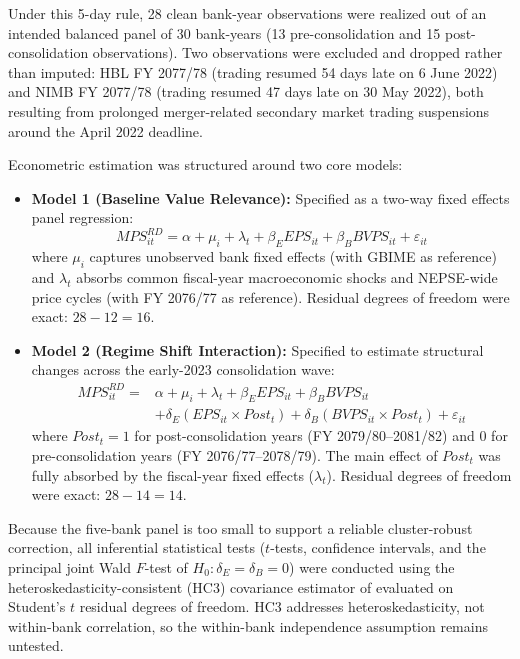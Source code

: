 Under this 5-day rule, 28 clean bank-year observations were realized out of an intended balanced panel of 30 bank-years (13 pre-consolidation and 15 post-consolidation observations). Two observations were excluded and dropped rather than imputed: HBL FY 2077/78 (trading resumed 54 days late on 6 June 2022) and NIMB FY 2077/78 (trading resumed 47 days late on 30 May 2022), both resulting from prolonged merger-related secondary market trading suspensions around the April 2022 deadline.

Econometric estimation was structured around two core models:
\begin{itemize}
    \item \textbf{Model 1 (Baseline Value Relevance):} Specified as a two-way fixed effects panel regression:
    \begin{equation}
    \mathit{MPS}^{RD}_{it} = \alpha + \mu_i + \lambda_t + \beta_E \mathit{EPS}_{it} + \beta_B \mathit{BVPS}_{it} + \varepsilon_{it}
    \end{equation}
    where $\mu_i$ captures unobserved bank fixed effects (with GBIME as reference) and $\lambda_t$ absorbs common fiscal-year macroeconomic shocks and NEPSE-wide price cycles (with FY 2076/77 as reference). Residual degrees of freedom were exact: $28 - 12 = 16$.
    \item \textbf{Model 2 (Regime Shift Interaction):} Specified to estimate structural changes across the early-2023 consolidation wave:
    \begin{equation}
    \begin{aligned}
    \mathit{MPS}^{RD}_{it} ={}& \alpha + \mu_i + \lambda_t + \beta_E \mathit{EPS}_{it} + \beta_B \mathit{BVPS}_{it} \\
    & + \delta_E (\mathit{EPS}_{it} \times \mathit{Post}_t) + \delta_B (\mathit{BVPS}_{it} \times \mathit{Post}_t) + \varepsilon_{it}
    \end{aligned}
    \end{equation}
    where $\mathit{Post}_t = 1$ for post-consolidation years (FY 2079/80--2081/82) and 0 for pre-consolidation years (FY 2076/77--2078/79). The main effect of $\mathit{Post}_t$ was fully absorbed by the fiscal-year fixed effects ($\lambda_t$). Residual degrees of freedom were exact: $28 - 14 = 14$.
\end{itemize}

Because the five-bank panel is too small to support a reliable cluster-robust correction, all inferential statistical tests ($t$-tests, confidence intervals, and the principal joint Wald $F$-test of $H_0: \delta_E = \delta_B = 0$) were conducted using the heteroskedasticity-consistent (HC3) covariance estimator of \citet{mackinnon1985} evaluated on Student's $t$ residual degrees of freedom. HC3 addresses heteroskedasticity, not within-bank correlation, so the within-bank independence assumption remains untested.

